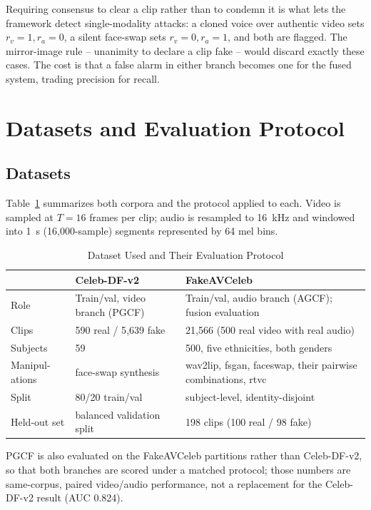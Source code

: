 \documentclass[conference]{IEEEtran}
\begin{document}
Requiring consensus to clear a clip rather than to condemn it is what lets the framework detect single-modality attacks: a cloned voice over authentic video sets $r_v=1, r_a=0$, a silent face-swap sets $r_v=0, r_a=1$, and both are flagged. The mirror-image rule -- unanimity to declare a clip fake -- would discard exactly these cases. The cost is that a false alarm in either branch becomes one for the fused system, trading precision for recall.

\section{Datasets and Evaluation Protocol}

\subsection{Datasets}
Table~\ref{tab:datasets} summarizes both corpora and the protocol applied to each. Video is sampled at $T=16$ frames per clip; audio is resampled to 16~kHz and windowed into 1~s (16{,}000-sample) segments represented by 64 mel bins.

\begin{table}[t]
\caption{Dataset Used and Their Evaluation Protocol}
\label{tab:datasets}
\centering
\small
\begin{tabular}{p{1.15cm}p{2.5cm}p{3.1cm}}
\toprule
 & \textbf{Celeb-DF-v2} & \textbf{FakeAVCeleb} \cite{khalid2021fakeavceleb} \\
\midrule
Role & Train/val, video branch (PGCF) & Train/val, audio branch (AGCF); fusion evaluation \\
Clips & 590 real / 5{,}639 fake & 21{,}566 (500 real video with real audio) \\
Subjects & 59 & 500, five ethnicities, both genders \\
Manipul-ations & face-swap synthesis & wav2lip, fsgan, faceswap, their pairwise combinations, rtvc \\
Split & 80/20 train/val & subject-level, identity-disjoint \\
Held-out set & balanced validation split & 198 clips (100 real / 98 fake) \\
\bottomrule
\end{tabular}
\end{table}

PGCF is also evaluated on the FakeAVCeleb partitions rather than Celeb-DF-v2, so that both branches are scored under a matched protocol; those numbers are same-corpus, paired video/audio performance, not a replacement for the Celeb-DF-v2 result (AUC 0.824).
\end{document}
